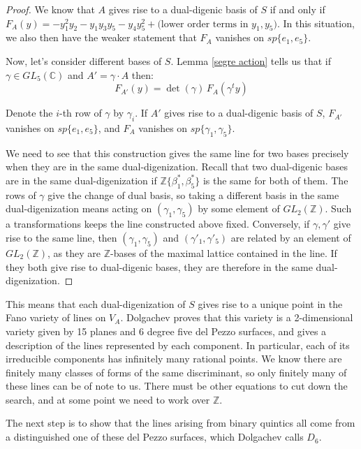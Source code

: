 \documentclass{report}
\begin{document}
\begin{proof}
We know that $A$ gives rise to a dual-digenic basis of $S$ if and only if $F_A(y) = - y_1^2 y_2 - y_1 y_3 y_5 - y_4 y_5^2 + \text{(lower order terms in $y_1, y_5$)}$.  In this situation, we also then have the weaker statement that $F_A$ vanishes on $sp\{e_1,e_5\}$.

Now, let's consider different bases of $S$.  Lemma \ref{segre action} tells us that if $\gamma \in GL_5(\mathbb{C})$ and $A' = \gamma \cdot A$ then:
\begin{equation}
F_{A'}(y) = \det(\gamma) \, F_A(\gamma^t y)
\end{equation}

Denote the $i$-th row of $\gamma$ by $\gamma_i$.  If $A'$ gives rise to a dual-digenic basis of $S$, $F_{A'}$ vanishes on $sp\{e_1,e_5\}$, and $F_A$ vanishes on $sp\{\gamma_1,\gamma_5\}$.

We need to see that this construction gives the same line for two bases precisely when they are in the same dual-digenization.  Recall that two dual-digenic bases are in the same dual-digenization if $\mathbb{Z}\{\beta_1^*,\beta_5^*\}$ is the same for both of them.  The rows of $\gamma$ give the change of dual basis, so taking a different basis in the same dual-digenization means acting on $( \gamma_1, \gamma_5 )$ by some element of $GL_2(\mathbb{Z})$.  Such a transformations keeps the line constructed above fixed.  Conversely, if $\gamma, \gamma'$ give rise to the same line, then $(\gamma_1,\gamma_5)$ and $(\gamma'_1, \gamma'_5)$ are related by an element of $GL_2(\mathbb{Z})$, as they are $\mathbb{Z}$-bases of the maximal lattice contained in the line.  If they both give rise to dual-digenic bases, they are therefore in the same dual-digenization.
\end{proof}

This means that each dual-digenization of $S$ gives rise to a unique point in the Fano variety of lines on $V_A$.  Dolgachev proves that this variety is a 2-dimensional variety given by 15 planes and 6 degree five del Pezzo surfaces, and gives a description of the lines represented by each component.  In particular, each of its irreducible components has infinitely many rational points.  We know there are finitely many classes of forms of the same discriminant, so only finitely many of these lines can be of note to us.  There must be other equations to cut down the search, and at some point we need to work over $\mathbb{Z}$.

The next step is to show that the lines arising from binary quintics all come from a distinguished one of these del Pezzo surfaces, which Dolgachev calls $D_6$.
\end{document}
